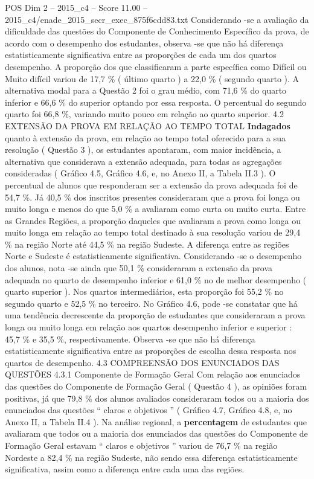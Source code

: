 \begin{textsample}{POS Dim 2 – 2015\_c4 – Score 11.00 – 2015\_c4/enade\_2015\_secr\_exec\_875f6cdd83.txt}
Considerando -se a avaliação da dificuldade das questões do Componente de Conhecimento Específico da prova, de acordo com o desempenho dos estudantes, observa -se que não há diferença estatisticamente significativa entre as proporções de cada um dos quartos desempenho.
A proporção dos que classificaram a parte específica como Difícil ou Muito difícil variou de 17,7 \% ( último quarto ) a 22,0 \% ( segundo quarto ).
A alternativa modal para a Questão 2 foi o grau médio, com 71,6 \% do quarto inferior e 66,6 \% do superior optando por essa resposta.
O percentual do segundo quarto foi 66,8 \%, variando muito pouco em relação ao quarto superior. 4.2 EXTENSÃO DA PROVA EM RELAÇÃO AO TEMPO TOTAL \textbf{Indagados} quanto à extensão da prova, em relação ao tempo total oferecido para a sua resolução ( Questão 3 ), os estudantes apontaram, com maior incidência, a alternativa que considerava a extensão adequada, para todas as agregações consideradas ( Gráfico 4.5, Gráfico 4.6, e, no Anexo II, a Tabela II.3 ).
O percentual de alunos que responderam ser a extensão da prova adequada foi de 54,7 \%.
Já 40,5 \% dos inscritos presentes consideraram que a prova foi longa ou muito longa e menos do que 5,0 \% a avaliaram como curta ou muito curta.
Entre as Grandes Regiões, a proporção daqueles que avaliaram a prova como longa ou muito longa em relação ao tempo total destinado à sua resolução variou de 29,4 \% na região Norte até 44,5 \% na região Sudeste.
A diferença entre as regiões Norte e Sudeste é estatisticamente significativa.
Considerando -se o desempenho dos alunos, nota -se ainda que 50,1 \% consideraram a extensão da prova adequada no quarto de desempenho inferior e 61,0 \% no de melhor desempenho ( quarto superior ).
Nos quartos intermediários, esta proporção foi 55,2 \% no segundo quarto e 52,5 \% no terceiro.
No Gráfico 4.6, pode -se constatar que há uma tendência decrescente da proporção de estudantes que consideraram a prova longa ou muito longa em relação aos quartos desempenho inferior e superior : 45,7 \% e 35,5 \%, respectivamente.
Observa -se que não há diferença estatisticamente significativa entre as proporções de escolha dessa resposta nos quartos de desempenho. 4.3 COMPREENSÃO DOS ENUNCIADOS DAS QUESTÕES 4.3.1 Componente de Formação Geral Com relação aos enunciados das questões do Componente de Formação Geral ( Questão 4 ), as opiniões foram positivas, já que 79,8 \% dos alunos avaliados consideraram todos ou a maioria dos enunciados das questões “ claros e objetivos ” ( Gráfico 4.7, Gráfico 4.8, e, no Anexo II, a Tabela II.4 ).
Na análise regional, a \textbf{percentagem} de estudantes que avaliaram que todos ou a maioria dos enunciados das questões do Componente de Formação Geral estavam “ claros e objetivos ” variou de 76,7 \% na região Nordeste a 82,4 \% na região Sudeste, não sendo essa diferença estatisticamente significativa, assim como a diferença entre cada uma das regiões.

\end{textsample}
